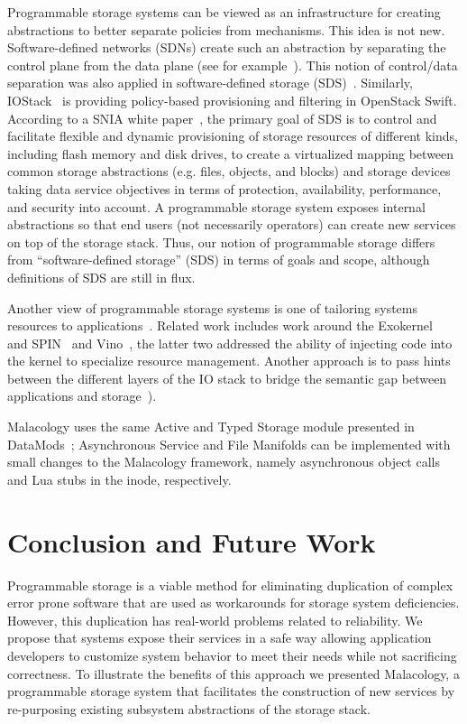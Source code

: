 \documentclass[preprint]{sigplanconf-eurosys}
\begin{document}
Programmable storage systems can be viewed as an infrastructure for creating
abstractions to better separate policies from mechanisms. This idea is not new.
Software-defined networks (SDNs) create such an abstraction by separating the
control plane from the data plane (see for example~\cite{jain:sigcomm13}). This
notion of control/data separation was also applied in software-defined storage
(SDS)~\cite{thereska:sosp13,stefanovici:fast16}. Similarly,
IOStack~\cite{gracia:internet16} is providing policy-based provisioning and
filtering in OpenStack Swift. According to a SNIA white
paper~\cite{carlson:snia2014}, the primary goal of SDS is to control and
facilitate flexible and dynamic provisioning of storage resources of different
kinds, including flash memory and disk drives, to create a virtualized mapping
between common storage abstractions (e.g. files, objects, and blocks) and
storage devices taking data service objectives in terms of protection,
availability, performance, and security into account. A programmable storage
system exposes internal abstractions so that end users (not necessarily
operators) can create new services on top of the storage stack. Thus, our
notion of programmable storage differs from ``software-defined storage'' (SDS)
in terms of goals and scope, although definitions of SDS are still in flux.

Another view of programmable storage systems is one of tailoring systems
resources to applications~\cite{arpaci:sosp01}. Related work includes work
around the Exokernel~\cite{engler:sosp95} and SPIN~\cite{bershad:sosp95} and
Vino~\cite{seltzer:osdi96}, the latter two addressed the ability of injecting
code into the kernel to specialize resource management. Another approach is to
pass hints between the different layers of the IO stack to bridge the semantic
gap between applications and
storage~\cite{arpaci:sosp01,sivathanu:fast03,mesnier:sosp11}).

Malacology uses the same Active and Typed Storage module presented in
DataMods~\cite{watkins_datamods_2012}; Asynchronous Service and File Manifolds
can be implemented with small changes to the Malacology framework, namely
asynchronous object calls and Lua stubs in the inode, respectively.

\section{Conclusion and Future Work}\label{conclusion-and-future-work}

Programmable storage is a viable method for eliminating duplication of complex
error prone software that are used as workarounds for storage system
deficiencies. However, this duplication has real-world problems related to
reliability. We propose that systems expose their services in a safe way
allowing application developers to customize system behavior to meet their
needs while not sacrificing correctness. To illustrate the benefits of this
approach we presented Malacology, a programmable storage system that
facilitates the construction of new services by re-purposing existing subsystem
abstractions of the storage stack.
\end{document}
